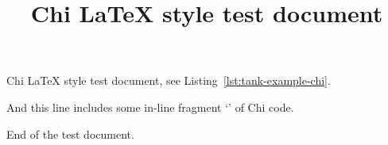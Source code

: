 \documentclass{article}
\title{Chi \LaTeX{} style test document}
\begin{document}
\maketitle

Chi \LaTeX{} style test document, see Listing~\ref{lst:tank-example-chi}.

\noindent
\medskip
{}

And this line includes some in-line fragment
`' of Chi code.

End of the test document.
\end{document}
